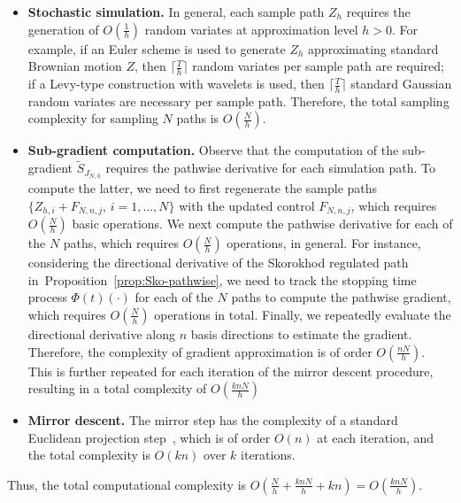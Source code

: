 \documentclass[11pt,leqno]{amsart}
\begin{document}
\begin{itemize}
\item {\bf Stochastic simulation.} 
In general, each sample path $Z_h$ requires the generation of $O\left( \frac{1}{h} \right)$ random variates at approximation level $h > 0$. For example, if an Euler scheme is used to generate $Z_h$ approximating standard Brownian motion $Z$, then $\lceil\frac{T}{h}\rceil$ random variates per sample path are required; if a Levy-type construction with wavelets is used, then $\lceil\frac{T}{h}\rceil$ standard Gaussian random variates are necessary per sample path. Therefore, the total sampling complexity for sampling $N$ paths is $O\left(\frac{N}{h}\right)$. 

\item {\bf Sub-gradient computation.} Observe that the computation of the sub-gradient $\tilde S_{J_{N,h}}$ requires the pathwise derivative for each simulation path. To compute the latter, we need to first regenerate the sample paths $\{Z_{h,i} + F_{N,n,j},\,i=1,\ldots,N\}$ with the updated control $F_{N,n,j}$, which requires $O\left(\frac{N}{h}\right)$ basic operations. We next  compute the pathwise derivative for each of the $N$ paths, which requires $O\left(\frac{N}{h} \right)$ operations, in general. For instance, considering the directional derivative of the Skorokhod regulated path in~Proposition~\ref{prop:Sko-pathwise}, we need to track the stopping time process $\Phi(t)(\cdot)$ for each of the $N$ paths to compute the pathwise gradient, which requires $O\left(\frac{N}{h}\right)$ operations in total. Finally, we repeatedly evaluate the directional derivative along $n$ basis directions to estimate the gradient. Therefore, the  complexity of gradient approximation is of order $O\left(\frac{nN}{h}\right)$. This is further repeated for each iteration of the mirror descent procedure, resulting in a total complexity of $O\left(\frac{knN}{h}\right)$

\item {\bf Mirror descent.} The mirror step has the complexity of a standard Euclidean projection step~\citep{2015bub}, which is of order $O(n)$ at each iteration, and the total complexity is $O(kn)$ over $k$ iterations.
\end{itemize}
Thus, the total computational complexity is $O\left(\frac{N}{h} + \frac{knN}{h} + kn\right)=O\left(\frac{knN}{h}\right)$. 
\end{document}
